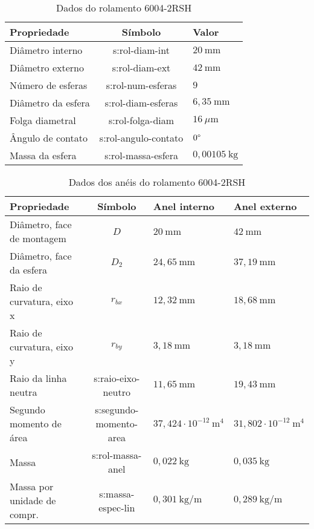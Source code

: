 \documentclass[12pt,oneside,english,brazil,lmodern,siglas,simbolos,cite=num]{ucsmonograph}
\begin{document}
	\begin{table}[t]
	\caption{Dados do rolamento 6004-2RSH}
	\def\arraystretch{1.2}
	\centering
	\begin{tabular}{l|c|l}
	\toprule
	\textbf{Propriedade} & \textbf{Símbolo} & \textbf{Valor} \\\midrule
	Diâmetro interno & \gls{s:rol-diam-int} & $20\ \text{mm}$ \\
	Diâmetro externo & \gls{s:rol-diam-ext} & $42\ \text{mm}$ \\
	Número de esferas & \gls{s:rol-num-esferas} & $ 9 $\\
	Diâmetro da esfera & \gls{s:rol-diam-esferas} & $6,35\ \text{mm}$ \\
	Folga diametral & \gls{s:rol-folga-diam} & $ 16\ \mu\text{m} $ \\
	Ângulo de contato & \gls{s:rol-angulo-contato} & $ 0\text\textdegree $ \\
	Massa da esfera & \gls{s:rol-massa-esfera} & $ 0,00105\ \text{kg} $ \\\bottomrule
	\end{tabular}
	\label{tbl:6004-gerais}
	\end{table}

	\begin{table}[b]
	\def\arraystretch{1.2}
	\caption{Dados dos anéis do rolamento 6004-2RSH}
	\begin{tabular}{l|c|l|l}
	\toprule
	\textbf{Propriedade} & \textbf{Símbolo} & \textbf{Anel interno} & \textbf{Anel externo} \\\midrule
	Diâmetro, face de montagem & $D$ & $20\ \text{mm}$ & $ 42\ \text{mm}$ \\
	Diâmetro, face da esfera & $D_2$ & $24,65\ \text{mm}$ & $37,19\ \text{mm}$ \\
	Raio de curvatura, eixo x & $r_{bx}$ & $12,32\ \text{mm}$ & $18,68\ \text{mm}$ \\
	Raio de curvatura, eixo y & $r_{by}$ & $3,18\ \text{mm}$ & $3,18\ \text{mm}$ \\
	Raio da linha neutra & \gls{s:raio-eixo-neutro} & $11,65\ \text{mm}$ & $19,43\ \text{mm}$ \\
	Segundo momento de área & \gls{s:segundo-momento-area} & $37,424\cdot 10^{-12}\ \text{m}^4$ & $31,802\cdot 10^{-12}\ \text{m}^4$ \\
	Massa & \gls{s:rol-massa-anel} & $0,022\ \text{kg}$ & $0,035\ \text{kg}$ \\
	Massa por unidade de compr. & \gls{s:massa-espec-lin} & $0,301\ \text{kg/m}$ & $0,289\ \text{kg/m}$ \\\bottomrule
	\end{tabular}
	\label{tbl:6004-aneis}
	\end{table}
\end{document}

